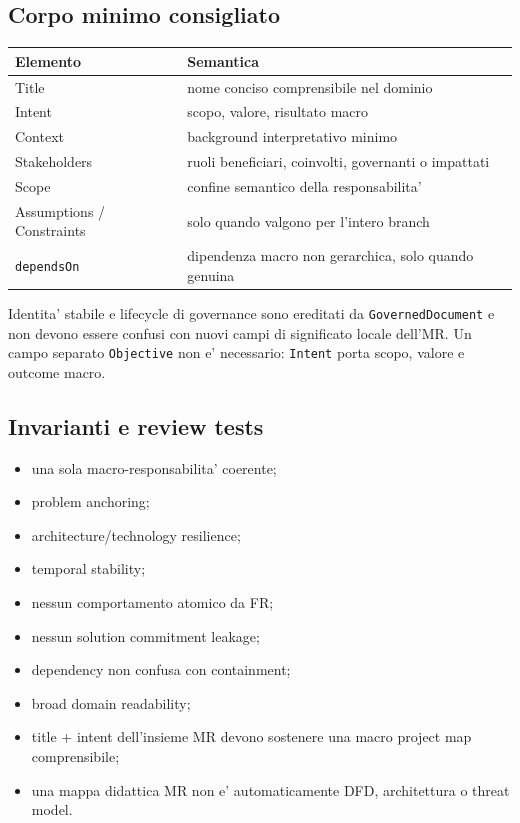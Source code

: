 \documentclass[11pt,a4paper]{article}
\begin{document}
\subsection{Corpo minimo consigliato}

\begin{tabularx}{\textwidth}{L{42mm}Y}
\toprule
\textbf{Elemento} & \textbf{Semantica} \\
\midrule
Title & nome conciso comprensibile nel dominio \\
Intent & scopo, valore, risultato macro \\
Context & background interpretativo minimo \\
Stakeholders & ruoli beneficiari, coinvolti, governanti o impattati \\
Scope & confine semantico della responsabilita' \\
Assumptions / Constraints & solo quando valgono per l'intero branch \\
\texttt{dependsOn} & dipendenza macro non gerarchica, solo quando genuina \\
\bottomrule
\end{tabularx}

Identita' stabile e lifecycle di governance sono ereditati da \texttt{GovernedDocument} e non devono essere confusi con nuovi campi di significato locale dell'MR. Un campo separato \texttt{Objective} non e' necessario: \texttt{Intent} porta scopo, valore e outcome macro.

\subsection{Invarianti e review tests}
\begin{itemize}
  \item una sola macro-responsabilita' coerente;
  \item problem anchoring;
  \item architecture/technology resilience;
  \item temporal stability;
  \item nessun comportamento atomico da FR;
  \item nessun solution commitment leakage;
  \item dependency non confusa con containment;
  \item broad domain readability;
  \item title + intent dell'insieme MR devono sostenere una macro project map comprensibile;
  \item una mappa didattica MR non e' automaticamente DFD, architettura o threat model.
\end{itemize}
\end{document}
